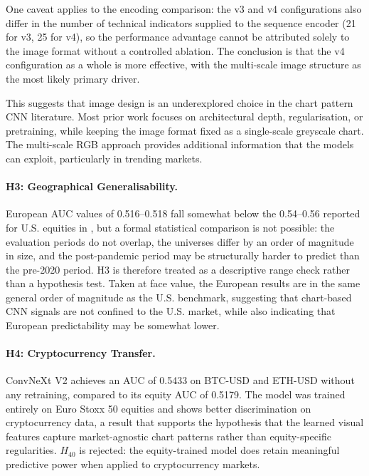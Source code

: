 One caveat applies to the encoding comparison: the v3 and v4 configurations also differ in the number of technical indicators supplied to the sequence encoder (21 for v3, 25 for v4), so the performance advantage cannot be attributed solely to the image format without a controlled ablation. The conclusion is that the v4 configuration as a whole is more effective, with the multi-scale image structure as the most likely primary driver.

This suggests that image design is an underexplored choice in the chart pattern CNN literature. Most prior work focuses on architectural depth, regularisation, or pretraining, while keeping the image format fixed as a single-scale greyscale chart. The multi-scale RGB approach provides additional information that the models can exploit, particularly in trending markets.

\paragraph{H3: Geographical Generalisability.}
European AUC values of 0.516--0.518 fall somewhat below the 0.54--0.56 reported for U.S. equities in \textcite{Jiang2023}, but a formal statistical comparison is not possible: the evaluation periods do not overlap, the universes differ by an order of magnitude in size, and the post-pandemic period may be structurally harder to predict than the pre-2020 period. H3 is therefore treated as a descriptive range check rather than a hypothesis test. Taken at face value, the European results are in the same general order of magnitude as the U.S. benchmark, suggesting that chart-based CNN signals are not confined to the U.S. market, while also indicating that European predictability may be somewhat lower.

\paragraph{H4: Cryptocurrency Transfer.}
ConvNeXt V2 achieves an AUC of 0.5433 on BTC-USD and ETH-USD without any retraining, compared to its equity AUC of 0.5179. The model was trained entirely on Euro Stoxx 50 equities and shows better discrimination on cryptocurrency data, a result that supports the hypothesis that the learned visual features capture market-agnostic chart patterns rather than equity-specific regularities. $H_{40}$ is rejected: the equity-trained model does retain meaningful predictive power when applied to cryptocurrency markets.

